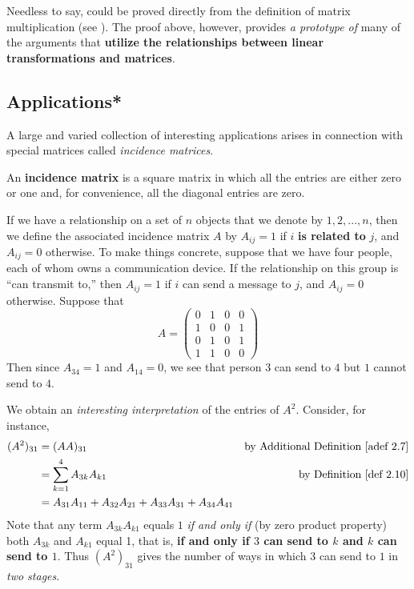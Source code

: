 \begin{remark} \label{remark 2.3.7}
Needless to say,  could be proved directly from the definition of matrix multiplication (see ).
The proof above, however, provides \emph{a prototype of} many of the arguments that \textbf{utilize the relationships between
linear transformations and matrices}.
\end{remark}

\subsection{Applications*}

A large and varied collection of interesting applications arises in connection with special matrices called \emph{incidence matrices}.

\begin{additional definition} \label{adef 2.8}
An \textbf{incidence matrix} is a square matrix in which all the entries are either zero or one and,
for convenience, all the diagonal entries are zero.
\end{additional definition}

If we have a relationship on a set of \(n\) objects that we denote by \(1, 2, ..., n\),
then we define the associated incidence matrix \(A\) by \(A_{ij} = 1\) if \(i\) \textbf{is related to} \(j\), and \(A_{ij} = 0\) otherwise.
To make things concrete, suppose that we have four people, each of whom owns a communication device.
If the relationship on this group is ``can transmit to,'' then \(A_{ij} = 1\) if \(i\) can send a message to \(j\), and \(A_{ij} = 0\) otherwise.
Suppose that
\[
    A = \begin{pmatrix}
        0 & 1 & 0 & 0 \\
        1 & 0 & 0 & 1 \\
        0 & 1 & 0 & 1 \\
        1 & 1 & 0 & 0
    \end{pmatrix}
\]
Then since \(A_{34} = 1\) and \(A_{14} = 0\), we see that person \(3\) can send to \(4\) but \(1\) cannot send to \(4\).

We obtain an \emph{interesting interpretation} of the entries of \(A^2\).
Consider, for instance,
\begin{align*}
    (A^2)_{31} & = (AA)_{31} & \text{by \ADEF{2.7}} \\
               & = \sum_{k = 1}^4 A_{3k} A_{k1} & \text{by \DEF{2.10}} \\
               & = A_{31} A_{11} + A_{32} A_{21} + A_{33} A_{31} + A_{34} A_{41}
\end{align*}
Note that any term \(A_{3k} A_{k1}\) equals \(1\) \emph{if and only if} (by zero product property) both \(A_{3k}\) and \(A_{k1}\) equal 1,
that is, \textbf{if and only if \(3\) can send to \(k\) and \(k\) can send to \(1\)}.
Thus \((A^2)_{31}\) gives the number of ways in which \(3\) can send to \(1\) in \emph{two stages}.

